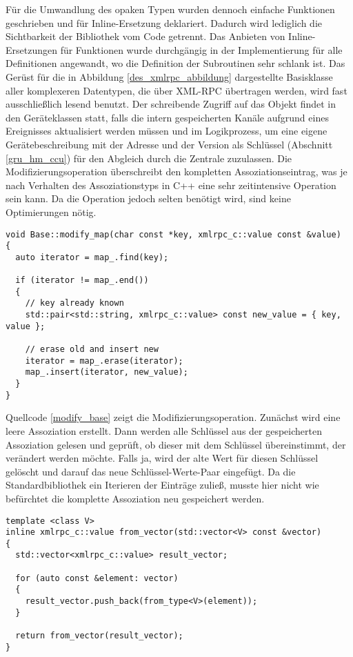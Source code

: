 Für die Umwandlung des opaken Typen wurden dennoch einfache Funktionen geschrieben und für
Inline-Ersetzung deklariert.
Dadurch wird lediglich die Sichtbarkeit der Bibliothek vom Code getrennt.
Das Anbieten von Inline-Ersetzungen für Funktionen wurde durchgängig in der Implementierung für alle
Definitionen angewandt, wo die Definition der Subroutinen sehr schlank ist.
Das Gerüst für die in Abbildung \ref{des_xmlrpc_abbildung} dargestellte Basisklasse aller komplexeren
Datentypen, die über XML-RPC übertragen werden, wird fast ausschließlich lesend benutzt.
Der schreibende Zugriff auf das Objekt findet in den Geräteklassen statt, falls die intern
gespeicherten Kanäle aufgrund eines Ereignisses aktualisiert werden müssen und im Logikprozess,
um eine eigene Gerätebeschreibung mit der Adresse und der Version als Schlüssel (Abschnitt \ref{gru_hm_ccu})
für den Abgleich durch die Zentrale zuzulassen.
Die Modifizierungsoperation überschreibt den kompletten Assoziationseintrag, was je nach Verhalten
des Assoziationstyps in C++ eine sehr zeitintensive Operation sein kann.
Da die Operation jedoch selten benötigt wird, sind keine Optimierungen nötig.

\lstset{language=C++}
\begin{lstlisting}[frame=single,caption={Modifizieren eines Basisobjekts für die Übertragung mit XML-RPC},label=modify_base]
void Base::modify_map(char const *key, xmlrpc_c::value const &value)
{
  auto iterator = map_.find(key);

  if (iterator != map_.end())
  {
    // key already known
    std::pair<std::string, xmlrpc_c::value> const new_value = { key, value };

    // erase old and insert new
    iterator = map_.erase(iterator);
    map_.insert(iterator, new_value);
  }
}
\end{lstlisting}

Quellcode \ref{modify_base} zeigt die Modifizierungsoperation.
Zunächst wird eine leere Assoziation erstellt.
Dann werden alle Schlüssel aus der gespeicherten Assoziation gelesen und geprüft, ob dieser mit dem
Schlüssel übereinstimmt, der verändert werden möchte.
Falls ja, wird der alte Wert für diesen Schlüssel gelöscht und darauf das neue Schlüssel-Werte-Paar
eingefügt.
Da die Standardbibliothek ein Iterieren der Einträge zuließ, musste hier nicht wie befürchtet die
komplette Assoziation neu gespeichert werden.

\lstset{language=C++}
\begin{lstlisting}[frame=single,caption={Umwandung eines C++-Vektors in einein opaken XML-RPC-Typ},label=conv_from]
template <class V>
inline xmlrpc_c::value from_vector(std::vector<V> const &vector)
{
  std::vector<xmlrpc_c::value> result_vector;

  for (auto const &element: vector)
  {
    result_vector.push_back(from_type<V>(element));
  }

  return from_vector(result_vector);
}
\end{lstlisting}


